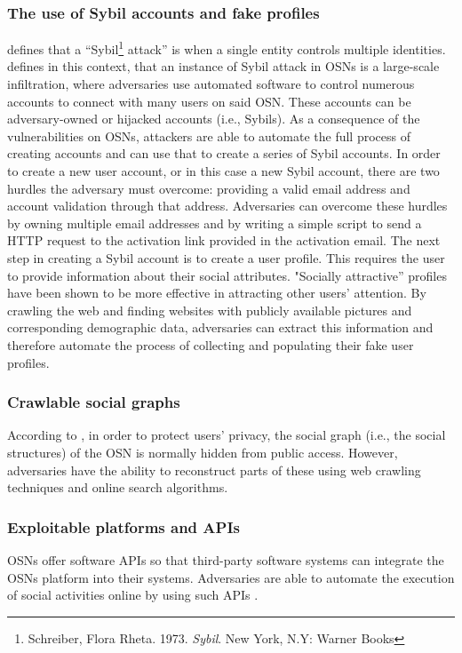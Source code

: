         \subsubsection{The use of Sybil accounts and fake profiles}
            \textcite[1]{sybilAttack} defines that a “Sybil\footnote{Schreiber, Flora Rheta. 1973. \textit{Sybil}. New York, N.Y: Warner Books} attack” is when a single entity controls multiple identities. \textcite[558-560]{DesignAnalysis} defines in this context, that an instance of Sybil attack in OSNs is a large-scale infiltration, where adversaries use automated software to control numerous accounts to connect with many users on said OSN. These accounts can be adversary-owned or hijacked accounts (i.e., Sybils). As a consequence of the vulnerabilities on OSNs, attackers are able to automate the full process of creating accounts and can use that to create a series of Sybil accounts. In order to create a new user account, or in this case a new Sybil account, there are two hurdles the adversary must overcome: providing a valid email address and account validation through that address. Adversaries can overcome these hurdles by owning multiple email addresses and by writing a simple script to send a HTTP request to the activation link provided in the activation email. The next step in creating a Sybil account is to create a user profile. This requires the user to provide information about their social attributes. "Socially attractive” profiles have been shown to be more effective in attracting other users’ attention. By crawling the web and finding websites with publicly available pictures and corresponding demographic data, adversaries can extract this information and therefore automate the process of collecting and populating their fake user profiles.
        
        \subsubsection{Crawlable social graphs}
            According to \textcite[560]{DesignAnalysis}, in order to protect users’ privacy, the social graph (i.e., the social structures) of the OSN is normally hidden from public access. However, adversaries have the ability to reconstruct parts of these using web crawling techniques and online search algorithms.
        
        \subsubsection{Exploitable platforms and APIs}
            OSNs offer software APIs so that third-party software systems can integrate the OSNs platform into their systems. Adversaries are able to automate the execution of social activities online by using such APIs \autocite[560]{DesignAnalysis}.


